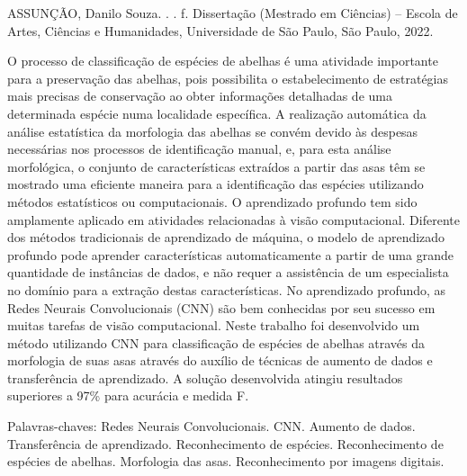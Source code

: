 \documentclass[
	12pt,				%
	oneside,			%
	a4paper,			%
	english,			%
	brazil				%
	]{abntex2ppgsi}
\begin{document}
\begin{resumo}

% 
%
% 
%
\begin{flushleft}
ASSUNÇÃO, Danilo Souza. \textbf{\imprimirtitulo}. \imprimirdata. \pageref{LastPage} f. Dissertação (Mestrado em Ciências) – Escola de Artes, Ciências e Humanidades, Universidade de São Paulo, São Paulo, 2022.
\end{flushleft}

O processo de classificação de espécies de abelhas é uma atividade importante para a preservação das abelhas, pois possibilita o estabelecimento de estratégias mais precisas de conservação ao obter informações detalhadas de uma determinada espécie numa localidade específica. A realização automática da análise estatística da morfologia das abelhas se convém devido às despesas necessárias nos processos de identificação manual, e, para esta análise morfológica, o conjunto de características extraídos a partir das asas têm se mostrado uma eficiente maneira para a identificação das espécies utilizando métodos estatísticos ou computacionais. O aprendizado profundo tem sido amplamente aplicado em atividades relacionadas à visão computacional. Diferente dos métodos tradicionais de aprendizado de máquina, o modelo de aprendizado profundo pode aprender características automaticamente a partir de uma grande quantidade de instâncias de dados, e não requer a assistência de um especialista no domínio para a extração destas características. No aprendizado profundo, as Redes Neurais Convolucionais (CNN) são bem conhecidas por seu sucesso em muitas tarefas de visão computacional. Neste trabalho foi desenvolvido um método utilizando CNN para classificação de espécies de abelhas através da morfologia de suas asas através do auxílio de técnicas de aumento de dados e transferência de aprendizado. A solução desenvolvida atingiu resultados superiores a 97\% para acurácia e medida F.

Palavras-chaves: Redes Neurais Convolucionais. CNN. Aumento de dados. Transferência de aprendizado. Reconhecimento de espécies. Reconhecimento de espécies de abelhas. Morfologia das asas. Reconhecimento por imagens digitais.
\end{resumo}
\end{document}
